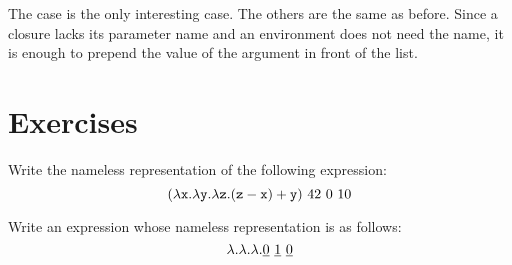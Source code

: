 The  case is the only interesting case. The others are the same as
before. Since a closure lacks its parameter name and an environment does not need
the name, it is enough to prepend the value of the argument in front of the list.

\section{Exercises}

\begin{exercise}

Write the nameless representation of the following expression:
\[
  (\lambda\texttt{x}.\lambda\texttt{y}.\lambda\texttt{z}.(\texttt{z}-\texttt{x})+\texttt{y})\ 42\ 0\ 10
\]

\end{exercise}

\begin{exercise}

Write an expression whose nameless representation is as follows:
\[
  \lambda.\lambda.\lambda.\underline{0}\ \underline{1}\ \underline{0}
\]

\end{exercise}
